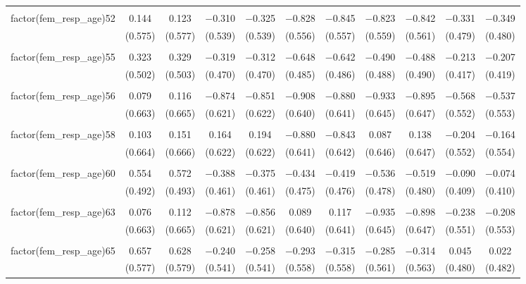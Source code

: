 \begin{table}[!htbp]
\begin{tabular}{@{\extracolsep{5pt}}lcccccccccc}
  & & & & & & & & & & \\ 
 factor(fem\_resp\_age)52 & 0.144 & 0.123 & $-$0.310 & $-$0.325 & $-$0.828 & $-$0.845 & $-$0.823 & $-$0.842 & $-$0.331 & $-$0.349 \\ 
  & (0.575) & (0.577) & (0.539) & (0.539) & (0.556) & (0.557) & (0.559) & (0.561) & (0.479) & (0.480) \\ 
  & & & & & & & & & & \\ 
 factor(fem\_resp\_age)55 & 0.323 & 0.329 & $-$0.319 & $-$0.312 & $-$0.648 & $-$0.642 & $-$0.490 & $-$0.488 & $-$0.213 & $-$0.207 \\ 
  & (0.502) & (0.503) & (0.470) & (0.470) & (0.485) & (0.486) & (0.488) & (0.490) & (0.417) & (0.419) \\ 
  & & & & & & & & & & \\ 
 factor(fem\_resp\_age)56 & 0.079 & 0.116 & $-$0.874 & $-$0.851 & $-$0.908 & $-$0.880 & $-$0.933 & $-$0.895 & $-$0.568 & $-$0.537 \\ 
  & (0.663) & (0.665) & (0.621) & (0.622) & (0.640) & (0.641) & (0.645) & (0.647) & (0.552) & (0.553) \\ 
  & & & & & & & & & & \\ 
 factor(fem\_resp\_age)58 & 0.103 & 0.151 & 0.164 & 0.194 & $-$0.880 & $-$0.843 & 0.087 & 0.138 & $-$0.204 & $-$0.164 \\ 
  & (0.664) & (0.666) & (0.622) & (0.622) & (0.641) & (0.642) & (0.646) & (0.647) & (0.552) & (0.554) \\ 
  & & & & & & & & & & \\ 
 factor(fem\_resp\_age)60 & 0.554 & 0.572 & $-$0.388 & $-$0.375 & $-$0.434 & $-$0.419 & $-$0.536 & $-$0.519 & $-$0.090 & $-$0.074 \\ 
  & (0.492) & (0.493) & (0.461) & (0.461) & (0.475) & (0.476) & (0.478) & (0.480) & (0.409) & (0.410) \\ 
  & & & & & & & & & & \\ 
 factor(fem\_resp\_age)63 & 0.076 & 0.112 & $-$0.878 & $-$0.856 & 0.089 & 0.117 & $-$0.935 & $-$0.898 & $-$0.238 & $-$0.208 \\ 
  & (0.663) & (0.665) & (0.621) & (0.621) & (0.640) & (0.641) & (0.645) & (0.647) & (0.551) & (0.553) \\ 
  & & & & & & & & & & \\ 
 factor(fem\_resp\_age)65 & 0.657 & 0.628 & $-$0.240 & $-$0.258 & $-$0.293 & $-$0.315 & $-$0.285 & $-$0.314 & 0.045 & 0.022 \\ 
  & (0.577) & (0.579) & (0.541) & (0.541) & (0.558) & (0.558) & (0.561) & (0.563) & (0.480) & (0.482) \\ 

\end{tabular}
\end{table}
